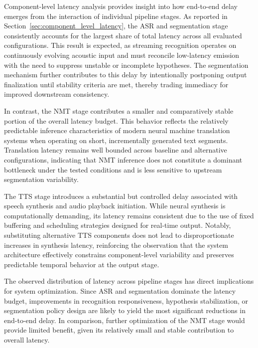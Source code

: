
Component-level latency analysis provides insight into how end-to-end delay emerges from the interaction of individual pipeline stages. As reported in Section~\ref{sec:component_level_latency}, the ASR and segmentation stage consistently accounts for the largest share of total latency across all evaluated configurations. This result is expected, as streaming recognition operates on continuously evolving acoustic input and must reconcile low-latency emission with the need to suppress unstable or incomplete hypotheses. The segmentation mechanism further contributes to this delay by intentionally postponing output finalization until stability criteria are met, thereby trading immediacy for improved downstream consistency.

In contrast, the NMT stage contributes a smaller and comparatively stable portion of the overall latency budget. This behavior reflects the relatively predictable inference characteristics of modern neural machine translation systems when operating on short, incrementally generated text segments. Translation latency remains well bounded across baseline and alternative configurations, indicating that NMT inference does not constitute a dominant bottleneck under the tested conditions and is less sensitive to upstream segmentation variability.

The TTS stage introduces a substantial but controlled delay associated with speech synthesis and audio playback initiation. While neural synthesis is computationally demanding, its latency remains consistent due to the use of fixed buffering and scheduling strategies designed for real-time output. Notably, substituting alternative TTS components does not lead to disproportionate increases in synthesis latency, reinforcing the observation that the system architecture effectively constrains component-level variability and preserves predictable temporal behavior at the output stage.


The observed distribution of latency across pipeline stages has direct implications for system optimization. Since ASR and segmentation dominate the latency budget, improvements in recognition responsiveness, hypothesis stabilization, or segmentation policy design are likely to yield the most significant reductions in end-to-end delay. In comparison, further optimization of the NMT stage would provide limited benefit, given its relatively small and stable contribution to overall latency.

